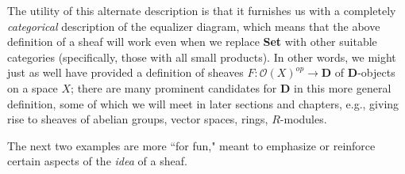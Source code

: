 \documentclass[11pt]{book}
\theoremstyle{definition}
\theoremstyle{definition}
\theoremstyle{definition}
\theoremstyle{theorem}
\theoremstyle{definition}
\begin{document}
\begin{center} 
\end{center} 
The utility of this alternate description is that it furnishes us with a completely \textit{categorical} description of the equalizer diagram, which means that the above definition of a sheaf will work even when we replace \textbf{Set} with other suitable categories (specifically, those with all small products). In other words, we might just as well have provided a definition of sheaves $F: \mathscr{O}(X)^{op} \rightarrow \textbf{D}$ of \textbf{D}-objects on a space $X$; there are many prominent candidates for \textbf{D} in this more general definition, some of which we will meet in later sections and chapters, e.g., giving rise to sheaves of abelian groups, vector spaces, rings, $R$-modules. \par 
The next two examples are more ``for fun," meant to emphasize or reinforce certain aspects of the \textit{idea} of a sheaf.
\end{document}
